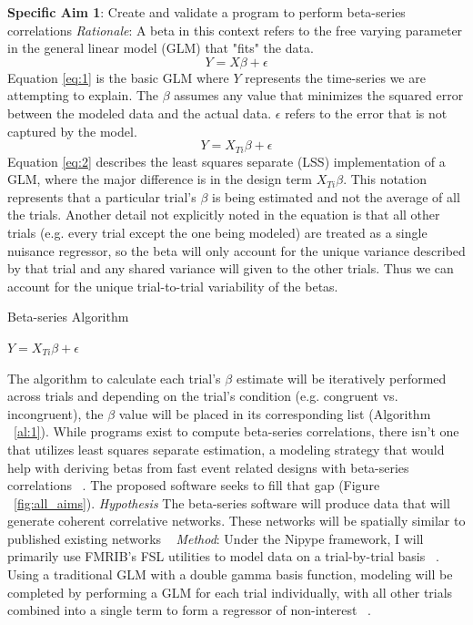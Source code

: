 \documentclass[phd,appendix,figures]{uithesis}
\begin{document}
\textbf{Specific Aim 1}: Create and validate a program to perform beta-series correlations
\newline
\textit{Rationale}: A beta in this context refers to the free varying parameter in the general linear model (GLM) that "fits" the data.
\begin{equation} \label{eq:1}
Y = X\beta + \epsilon 
\end{equation}
Equation \ref{eq:1} is the basic GLM where $Y$ represents the time-series we are attempting to explain. The $\beta$ assumes any value that minimizes the squared error between the modeled data and the actual data. 
$\epsilon$ refers to the error that is not captured by the model.
\begin{equation} \label{eq:2}
Y = X_{Ti}\beta + \epsilon
\end{equation}
Equation \ref{eq:2} describes the least squares separate (LSS) implementation of a GLM, where the major difference is in the design term $X_{Ti}\beta$.
This notation represents that a particular trial's $\beta$ is being estimated and not the average of all the trials.
Another detail not explicitly noted in the equation is that all other trials (e.g. every trial except the one being modeled) are treated as a single nuisance regressor, so the beta will only account for the unique variance described by that trial and any shared variance will given to the other trials.
Thus we can account for the unique trial-to-trial variability of the betas.
\begin{algorithm}
	\caption{Beta-series Algorithm}\label{al:1}
	\begin{algorithmic}[1]
    		\STATE \texttt{$Y = X_{Ti}\beta + \epsilon$}
		\ENDFOR
	\end{algorithmic}
\end{algorithm}
The algorithm to calculate each trial's $\beta$ estimate will be iteratively performed across trials and depending on the trial's condition (e.g. congruent vs. incongruent), the $\beta$ value will be placed in its corresponding list (Algorithm ~\ref{al:1}).
While programs exist to compute beta-series correlations, there isn't one that utilizes least squares separate estimation, a modeling strategy that would help with deriving betas from fast event related designs with beta-series correlations ~\citep{Mumford2012,Gottlich2015}. 
The proposed software seeks to fill that gap (Figure ~\ref{fig:all_aims}).
\newline
\textit{Hypothesis}
The beta-series software will produce data that will generate coherent correlative networks.
These networks will be spatially similar to published existing networks ~\citep{Smith2009,Dosenbach2010}
\newline
\textit{Method}: Under the Nipype framework, I will primarily use FMRIB's FSL utilities to model data on a trial-by-trial basis ~\citep{Smith2004,Gorgolewski2017}. 
Using a traditional GLM with a double gamma basis function, modeling will be completed by performing a GLM for each trial individually, with all other trials combined into a single term to form a regressor of non-interest ~\citep{Mumford2012}.
\end{document}
